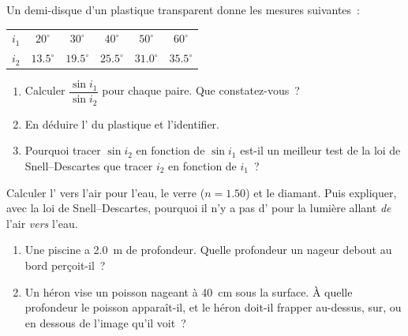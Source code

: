 \begin{exercise}[$\star\star$]\label{exo:g10:refraction:6}
Un demi-disque d'un plastique transparent donne les mesures suivantes~:
\begin{center}
\begin{tabular}{lccccc}
$i_1$ & $20^\circ$ & $30^\circ$ & $40^\circ$ & $50^\circ$ & $60^\circ$ \\
$i_2$ & $13.5^\circ$ & $19.5^\circ$ & $25.5^\circ$ & $31.0^\circ$
      & $35.5^\circ$ \\
\end{tabular}
\end{center}
\begin{enumerate}
  \item Calculer $\dfrac{\sin i_1}{\sin i_2}$ pour chaque paire. Que
        constatez-vous~?
  \item En déduire l' du plastique et l'identifier.
  \item Pourquoi tracer $\sin i_2$ en fonction de $\sin i_1$ est-il un
        meilleur test de la loi de Snell--Descartes que tracer
        $i_2$ en fonction de $i_1$~?
\end{enumerate}
\end{exercise}

\begin{exercise}[$\star\star$]\label{exo:g10:refraction:7}
Calculer l' vers l'air pour l'eau, le verre
($n = 1.50$) et le diamant. Puis expliquer, avec la
loi de Snell--Descartes, pourquoi il n'y a pas d' pour la lumière allant \emph{de} l'air \emph{vers} l'eau.
\end{exercise}

\begin{exercise}[$\star\star$]\label{exo:g10:refraction:8}
\begin{enumerate}
  \item Une piscine a \qty{2.0}{m} de profondeur. Quelle profondeur un
        nageur debout au bord perçoit-il~?
  \item Un héron vise un poisson nageant à \qty{40}{cm} sous la
        surface. À quelle profondeur le poisson apparaît-il, et le
        héron doit-il frapper au-dessus, sur, ou en dessous de l'image
        qu'il voit~?
\end{enumerate}
\end{exercise}

